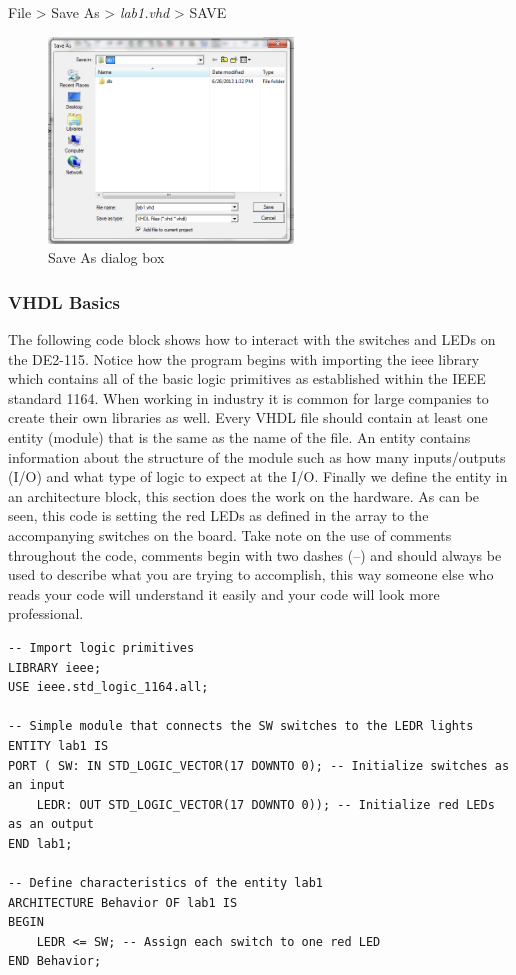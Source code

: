 File > Save As > \emph{lab1.vhd} > SAVE

\begin{figure}[H]
	\centering
	\includegraphics[width=65mm]{Lab1/figures/saveas.png}
	\caption{Save As dialog box}
	\label{fig:saveas}
\end{figure}

\subsubsection{VHDL Basics}

The following code block shows how to interact with the switches and LEDs on the DE2-115. Notice how the program begins with importing the ieee library which contains all of the basic logic primitives as established within the IEEE standard 1164. When working in industry it is common for large companies to create their own libraries as well. Every VHDL file should contain at least one entity (module) that is the same as the name of the file. An entity contains information about the structure of the module such as how many inputs/outputs (I/O) and what type of logic to expect at the I/O. Finally we define the entity in an architecture block, this section does the work on the hardware. As can be seen, this code is setting the red LEDs as defined in the array to the accompanying switches on the board. Take note on the use of comments throughout the code, comments begin with two dashes (--) and should always be used to describe what you are trying to accomplish, this way someone else who reads your code will understand it easily and your code will look more professional. 

\begin{lstlisting}
-- Import logic primitives
LIBRARY ieee;
USE ieee.std_logic_1164.all;

-- Simple module that connects the SW switches to the LEDR lights
ENTITY lab1 IS
PORT ( SW: IN STD_LOGIC_VECTOR(17 DOWNTO 0); -- Initialize switches as an input
	LEDR: OUT STD_LOGIC_VECTOR(17 DOWNTO 0)); -- Initialize red LEDs as an output
END lab1;

-- Define characteristics of the entity lab1
ARCHITECTURE Behavior OF lab1 IS
BEGIN
	LEDR <= SW; -- Assign each switch to one red LED
END Behavior;
\end{lstlisting}

